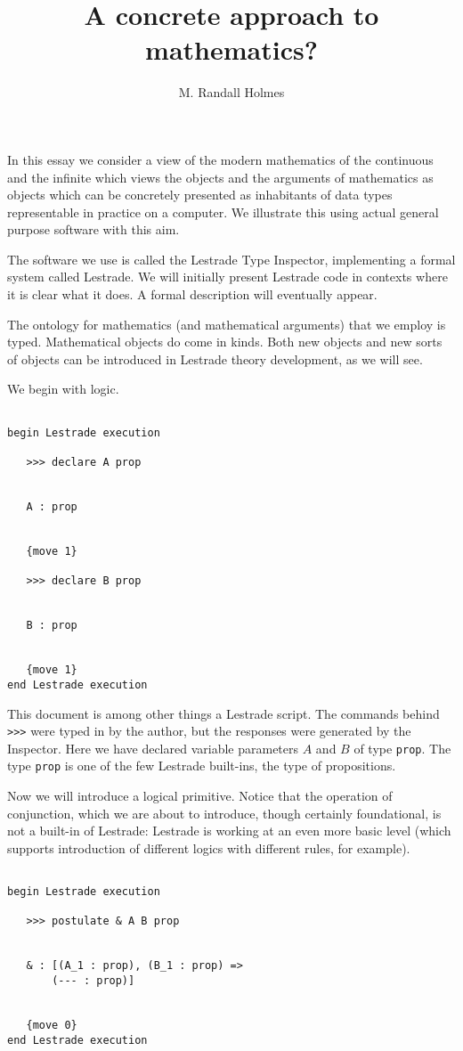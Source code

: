 \documentclass[12pt]{article}
\title{A concrete approach to mathematics?}
\author{M. Randall Holmes}
\begin{document}
\maketitle

In this essay we consider a view of the modern mathematics of the continuous and the infinite which views the objects and the arguments of mathematics as objects which can be concretely presented as inhabitants of data types representable in practice on a computer.   We illustrate this using actual general purpose software with this aim.

The software we use is called the Lestrade Type Inspector, implementing a formal system called Lestrade.  We will initially present Lestrade code in contexts where it is clear what it does.  A formal description will eventually appear.

The ontology for mathematics (and mathematical arguments) that we employ is typed.  Mathematical objects do come in kinds.  Both new objects and new sorts of objects can be introduced in Lestrade theory development, as we will see.

We begin with logic.

\begin{verbatim}

begin Lestrade execution

   >>> declare A prop


   A : prop


   {move 1}

   >>> declare B prop


   B : prop


   {move 1}
end Lestrade execution

\end{verbatim}

This document is among other things a Lestrade script.  The commands behind {\tt >>>} were typed in by the author, but the responses were generated by the Inspector.  Here we have declared variable parameters $A$ and $B$ of type {\tt prop}.
The type {\tt prop} is one of the few Lestrade built-ins, the type of propositions.

Now we will introduce a logical primitive.  Notice that the operation of conjunction, which we are about to introduce, though certainly foundational, is not a built-in of Lestrade:  Lestrade is working at an even more basic level (which supports introduction of different logics with different rules, for example).

\begin{verbatim}

begin Lestrade execution

   >>> postulate & A B prop


   & : [(A_1 : prop), (B_1 : prop) => 
       (--- : prop)]


   {move 0}
end Lestrade execution
\end{verbatim}
\end{document}
